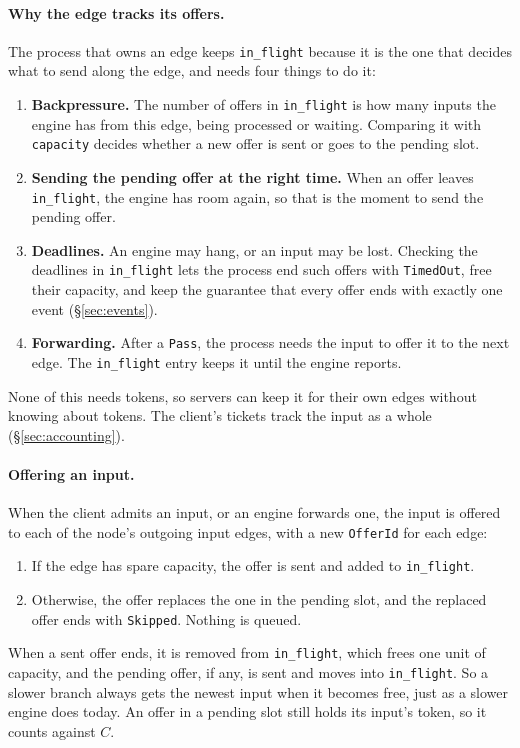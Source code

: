\documentclass[11pt]{article}
\newcommand{\code}[1]{\texttt{#1}}
\begin{document}
\paragraph{Why the edge tracks its offers.} The process that owns an edge
keeps \code{in\_flight} because it is the one that decides what to send along
the edge, and needs four things to do it:
\begin{enumerate}[nosep]
  \item \textbf{Backpressure.} The number of offers in \code{in\_flight} is
        how many inputs the engine has from this edge, being processed or
        waiting. Comparing it with \code{capacity} decides whether a new
        offer is sent or goes to the pending slot.
  \item \textbf{Sending the pending offer at the right time.} When an offer
        leaves \code{in\_flight}, the engine has room again, so that is the
        moment to send the pending offer.
  \item \textbf{Deadlines.} An engine may hang, or an input may be lost.
        Checking the deadlines in \code{in\_flight} lets the process end such
        offers with \code{TimedOut}, free their capacity, and keep the
        guarantee that every offer ends with exactly one event
        (\S\ref{sec:events}).
  \item \textbf{Forwarding.} After a \code{Pass}, the process needs the
        input to offer it to the next edge. The \code{in\_flight} entry
        keeps it until the engine reports.
\end{enumerate}
None of this needs tokens, so servers can keep it for their own edges
without knowing about tokens. The client's tickets track the input as a
whole (\S\ref{sec:accounting}).

\paragraph{Offering an input.} When the client admits an input, or an engine
forwards one, the input is offered to each of the node's outgoing input
edges, with a new \code{OfferId} for each edge:
\begin{enumerate}[nosep]
  \item If the edge has spare capacity, the offer is sent and added to
        \code{in\_flight}.
  \item Otherwise, the offer replaces the one in the pending slot, and the
        replaced offer ends with \code{Skipped}. Nothing is queued.
\end{enumerate}
When a sent offer ends, it is removed from \code{in\_flight}, which frees
one unit of capacity, and the pending offer, if any, is sent and moves into
\code{in\_flight}. So a slower branch always gets the newest input when it becomes free,
just as a slower engine does today. An offer in a pending slot still holds
its input's token, so it counts against $C$.
\end{document}
